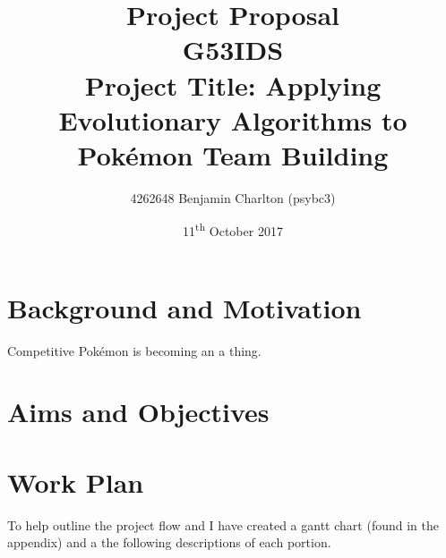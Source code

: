 \documentclass{article}
\newcommand{\Pokemon}{Pok\'{e}mon}
\begin{document}
\title{
    Project Proposal
    \\ \large{G53IDS}
    \\ \large{Project Title: Applying Evolutionary Algorithms to \Pokemon{} Team Building}\vspace{-3ex}}
\author{4262648 Benjamin Charlton (psybc3)}
\date{\vspace{-2ex}11\textsuperscript{th} October 2017}
\maketitle

\section{Background and Motivation}
Competitive \Pokemon{} is becoming an a thing.

\section{Aims and Objectives}
\lipsum[1]

\section{Work Plan}
To help outline the project flow and I have created a gantt chart (found in the appendix) and a the following descriptions of each portion.
\end{document}
